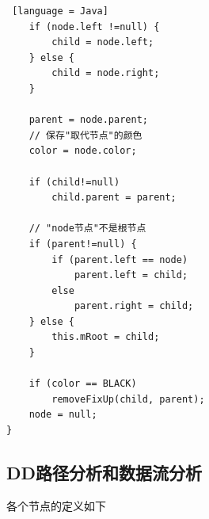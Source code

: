 \documentclass[12pt, a4paper, oneside]{ctexart}
\begin{document}
\begin{lstlisting} [language = Java]
    if (node.left !=null) {
        child = node.left;
    } else {
        child = node.right;
    }

    parent = node.parent;
    // 保存"取代节点"的颜色
    color = node.color;

    if (child!=null)
        child.parent = parent;

    // "node节点"不是根节点
    if (parent!=null) {
        if (parent.left == node)
            parent.left = child;
        else
            parent.right = child;
    } else {
        this.mRoot = child;
    }

    if (color == BLACK)
        removeFixUp(child, parent);
    node = null;
}
\end{lstlisting}

\subsection{DD路径分析和数据流分析}

各个节点的定义如下
\end{document}
